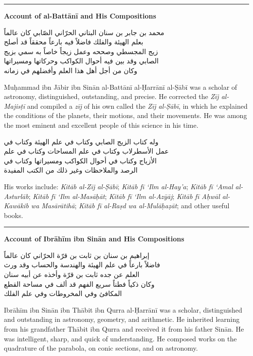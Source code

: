 \documentclass[11pt,a4paper]{article}
\newcommand{\longline}{\noindent\rule{\textwidth}{0.4pt}}
\newcommand{\ar}[1]{{\arabicfont\beginR #1\endR}}
\newcommand{\bilingual}[2]{%
  \noindent
  \begin{minipage}[t]{0.47\textwidth}
    \vspace{0pt}
    \begin{flushright}
    {\arabicfont\beginR #1\endR}
    \end{flushright}
  \end{minipage}%
  \hfill\vline\hfill
  \begin{minipage}[t]{0.47\textwidth}
    \vspace{0pt}
    #2
  \end{minipage}%
  \par\vspace{0.8em}
}
\newcommand{\bilingualsubsection}[2]{%
  \vspace{0.6em}%
  \noindent
  \begin{minipage}[t]{0.47\textwidth}
    \begin{flushright}
    \textbf{\color{sectioncolor}\ar{#1}}
    \end{flushright}
  \end{minipage}%
  \hfill
  \begin{minipage}[t]{0.47\textwidth}
    \textbf{\color{sectioncolor}#2}
  \end{minipage}%
  \par\vspace{0.4em}%
}
\begin{document}
\vspace{1em}
\longline
\vspace{0.5em}

\bilingualsubsection{ذكر البتاني ومصنفاته}{Account of al-Batt\=an\=i and His Compositions}

\vspace{0.5em}
\bilingual
{محمد بن جابر بن سنان البتاني الحرّاني الصّابي كان عالماً\\
بعلم الهيئة والفلك فاضلاً فيه بارعاً محققاً قد أصلح\\
زيج المجسطي وصححه وعمل زيجاً خاصاً به سمي بزيج\\
الصابي وقد بين فيه أحوال الكواكب وحركاتها ومسيراتها\\
وكان من أجل أهل هذا العلم وأفضلهم في زمانه}
{Mu\d{h}ammad ibn J\=abir ibn Sin\=an al-Batt\=an\=i al-\d{H}arr\=an\=i
al-\d{S}\=ab\=i was a scholar of astronomy, distinguished, outstanding,
and precise. He corrected the \textit{Z\=ij al-Majis\d{t}\=i} and compiled a
\textit{z\=ij} of his own called the \textit{Z\=ij al-\d{S}\=ab\=i}, in which
he explained the conditions of the planets, their motions, and their
movements. He was among the most eminent and excellent people of this
science in his time.}

\vspace{0.5em}
\bilingual
{وله كتاب الزيج الصابي وكتاب في علم الهيئة وكتاب في\\
عمل الأسطرلاب وكتاب في علم المساحات وكتاب في علم\\
الأزياج وكتاب في أحوال الكواكب ومسيراتها وكتاب في\\
الرصد والملاحظات وغير ذلك من الكتب المفيدة}
{His works include: \textit{Kit\=ab al-Z\=ij al-\d{S}\=ab\=i};
\textit{Kit\=ab f\=i \textquoteleft Ilm al-Hay'a}; \textit{Kit\=ab f\=i
\textquoteleft Amal al-Asturl\=ab}; \textit{Kit\=ab f\=i \textquoteleft Ilm
al-Mas\=a\d{h}\=at}; \textit{Kit\=ab f\=i \textquoteleft Ilm al-Az\=y\=aj};
\textit{Kit\=ab f\=i A\d{h}w\=al al-Kaw\=akib wa Mas\=ar\=atih\=a};
\textit{Kit\=ab f\=i al-Ra\d{s}d wa al-Mul\=a\d{h}a\d{z}\=at}; and other
useful books.}

\vspace{1em}
\longline
\vspace{0.5em}

\bilingualsubsection{ذكر إبراهيم بن سنان ومصنفاته}{Account of Ibr\=ah\=im ibn Sin\=an and His Compositions}

\vspace{0.5em}
\bilingual
{إبراهيم بن سنان بن ثابت بن قرّة الحرّاني كان عالماً\\
فاضلاً بارعاً في علم الهيئة والهندسة والحساب وقد ورث\\
العلم عن جده ثابت بن قرّة وأخذه عن أبيه سنان\\
وكان ذكياً فطناً سريع الفهم قد ألف في مساحة القطع\\
المكافئ وفي المخروطات وفي علم الفلك}
{Ibr\=ah\=im ibn Sin\=an ibn Th\=abit ibn Qurra al-\d{H}arr\=an\=i was a
scholar, distinguished and outstanding in astronomy, geometry, and
arithmetic. He inherited learning from his grandfather Th\=abit ibn Qurra
and received it from his father Sin\=an. He was intelligent, sharp, and
quick of understanding. He composed works on the quadrature of the
parabola, on conic sections, and on astronomy.}
\end{document}
